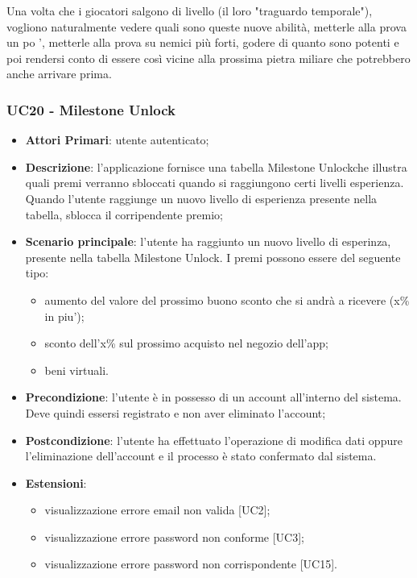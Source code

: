 
Una volta che i giocatori salgono di livello (il loro "traguardo temporale"), vogliono naturalmente vedere quali sono queste nuove abilità, metterle alla prova un po ', metterle alla prova su nemici più forti, godere di quanto sono potenti e poi rendersi conto di essere così vicine alla prossima pietra miliare che potrebbero anche arrivare prima.


\subsubsection{UC20 - Milestone Unlock}
\begin{itemize}
	\item \textbf{Attori Primari}: utente autenticato;
	\item \textbf{Descrizione}: l'applicazione fornisce una tabella Milestone Unlock\glosp che illustra quali premi verranno sbloccati quando si raggiungono certi livelli esperienza. Quando l'utente raggiunge un nuovo livello di esperienza presente nella tabella, sblocca il corripendente premio;	
	\item \textbf{Scenario principale}: l'utente ha raggiunto un nuovo livello di esperinza, presente nella tabella Milestone Unlock. 
	I premi possono essere del seguente tipo:
	\begin{itemize}
		\item aumento del valore del prossimo buono sconto che si andrà a ricevere (x\% in piu');
		\item sconto dell'x\% sul prossimo acquisto nel negozio dell'app;
		\item beni virtuali.
	\end{itemize}
	\item \textbf{Precondizione}: l'utente è in possesso di un account all'interno del sistema. Deve quindi essersi registrato e non aver eliminato l'account;
	\item \textbf{Postcondizione}: l'utente ha effettuato l'operazione di modifica dati oppure l'eliminazione dell'account e il processo è stato confermato dal sistema.
	\item \textbf{Estensioni}:
	\begin{itemize}
		\item visualizzazione errore email non valida [UC2];
		\item visualizzazione errore password non conforme [UC3];
		\item visualizzazione errore password non corrispondente [UC15].
	\end{itemize}
\end{itemize}
